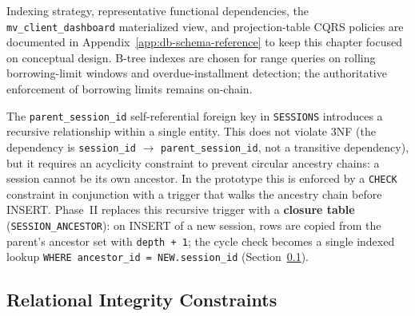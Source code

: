 \documentclass[12pt,a4paper]{report}
\begin{document}
Indexing strategy, representative functional dependencies, the \texttt{mv\_client\_dashboard} materialized view, and projection-table CQRS policies are documented in Appendix~\ref{app:db-schema-reference} to keep this chapter focused on conceptual design. B-tree indexes are chosen for range queries on rolling borrowing-limit windows and overdue-installment detection; the authoritative enforcement of borrowing limits remains on-chain.

\noindent The \texttt{parent\_session\_id} self-referential foreign key in
\texttt{SESSIONS} introduces a recursive relationship within a single entity.
This does not violate 3NF (the dependency is \texttt{session\_id} $\to$
\texttt{parent\_session\_id}, not a transitive dependency), but it requires an
acyclicity constraint to prevent circular ancestry chains: a session cannot be
its own ancestor. In the prototype this is enforced by a \texttt{CHECK} constraint
in conjunction with a trigger that walks the ancestry chain before INSERT. Phase~II
replaces this recursive trigger with a \textbf{closure table} (\texttt{SESSION\_ANCESTOR}):
on INSERT of a new session, rows are copied from the parent's ancestor set with
\texttt{depth + 1}; the cycle check becomes a single indexed lookup
\texttt{WHERE ancestor\_id = NEW.session\_id} (Section~\ref{sec:integrity-constraints}).

\subsection{Relational Integrity Constraints}
\label{sec:integrity-constraints}
\end{document}
